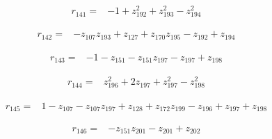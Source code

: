 \par\noindent\begin{minipage}{\linewidth}
\begin{align*}
r_{141}={}&-1+z_{192}^{2}+z_{193}^{2}-z_{194}^{2}
\end{align*}
\end{minipage}\par
\par\noindent\begin{minipage}{\linewidth}
\begin{align*}
r_{142}={}&-z_{107}z_{193}+z_{127}+z_{170}z_{195}-z_{192}+z_{194}
\end{align*}
\end{minipage}\par
\par\noindent\begin{minipage}{\linewidth}
\begin{align*}
r_{143}={}&-1-z_{151}-z_{151}z_{197}-z_{197}+z_{198}
\end{align*}
\end{minipage}\par
\par\noindent\begin{minipage}{\linewidth}
\begin{align*}
r_{144}={}&z_{196}^{2}+2z_{197}+z_{197}^{2}-z_{198}^{2}
\end{align*}
\end{minipage}\par
\par\noindent\begin{minipage}{\linewidth}
\begin{align*}
r_{145}={}&1-z_{107}-z_{107}z_{197}+z_{128}+z_{172}z_{199}-z_{196}+z_{197}+z_{198}
\end{align*}
\end{minipage}\par
\par\noindent\begin{minipage}{\linewidth}
\begin{align*}
r_{146}={}&-z_{151}z_{201}-z_{201}+z_{202}
\end{align*}
\end{minipage}\par
